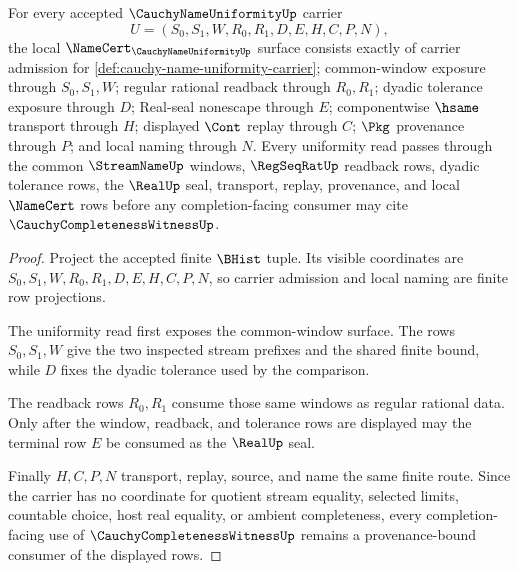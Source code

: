 \begin{theorem}
\label{thm:cauchy-name-uniformity-namecert-obligations}
For every accepted $\CauchyNameUniformityUp$ carrier
$$
U=(S_0,S_1,W,R_0,R_1,D,E,H,C,P,N),
$$
the local $\NameCert_{\CauchyNameUniformityUp}$ surface consists exactly of carrier admission for \autoref{def:cauchy-name-uniformity-carrier}; common-window exposure through $S_0,S_1,W$; regular rational readback through $R_0,R_1$; dyadic tolerance exposure through $D$; Real-seal nonescape through $E$; componentwise $\hsame$ transport through $H$; displayed $\Cont$ replay through $C$; $\Pkg$ provenance through $P$; and local naming through $N$. Every uniformity read passes through the common $\StreamNameUp$ windows, $\RegSeqRatUp$ readback rows, dyadic tolerance rows, the $\RealUp$ seal, transport, replay, provenance, and local $\NameCert$ rows before any completion-facing consumer may cite $\CauchyCompletenessWitnessUp$.
\end{theorem}
\begin{proof}
Project the accepted finite $\BHist$ tuple. Its visible coordinates are $S_0,S_1,W,R_0,R_1,D,E,H,C,P,N$, so carrier admission and local naming are finite row projections.

The uniformity read first exposes the common-window surface. The rows $S_0,S_1,W$ give the two inspected stream prefixes and the shared finite bound, while $D$ fixes the dyadic tolerance used by the comparison.

The readback rows $R_0,R_1$ consume those same windows as regular rational data. Only after the window, readback, and tolerance rows are displayed may the terminal row $E$ be consumed as the $\RealUp$ seal.

Finally $H,C,P,N$ transport, replay, source, and name the same finite route. Since the carrier has no coordinate for quotient stream equality, selected limits, countable choice, host real equality, or ambient completeness, every completion-facing use of $\CauchyCompletenessWitnessUp$ remains a provenance-bound consumer of the displayed rows.
\end{proof}



